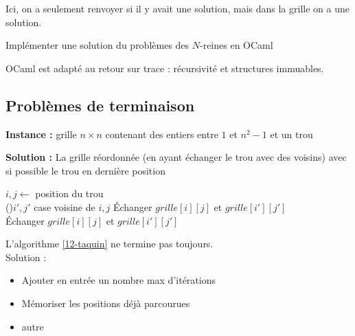 \begin{rem}
	Ici, on a seulement renvoyer si il y avait une solution, mais dans la grille on a une solution.
\end{rem}

\begin{exercise}
	Implémenter une solution du problèmes des $N$-reines en OCaml
\end{exercise}

\begin{rem}
	OCaml est adapté au retour sur trace : récursivité et structures immuables.
\end{rem}

\subsection{Problèmes de terminaison}

\begin{definition}\enspace
	
	\textbf{Instance :} grille $n\times n$ contenant des entiers entre $1$ et $n^2-1$ et un trou
	
	\textbf{Solution :} La grille réordonnée (en ayant échanger le trou avec des voisins) avec si possible le trou en dernière position
\end{definition}

\begin{algorithm}
	\label{12-taquin}
	\caption{$Taquin(grille)$}
	{
	}
	$i,j \gets $ position du trou\\
	\Pour(){$i', j'$ case voisine de $i,j$}
	{
		Échanger $grille[i][j]$ et $grille[i'][j']$\\
			{}
		Échanger $grille[i][j]$ et $grille[i'][j']$ \quad {}
	}
\end{algorithm}

\begin{idee}
	L'algorithme \ref{12-taquin} ne termine pas toujours.\\
	Solution : \begin{itemize}
		\item Ajouter en entrée un nombre max d'itérations
		\item Mémoriser les positions déjà parcourues
		\item autre
	\end{itemize}
\end{idee}

